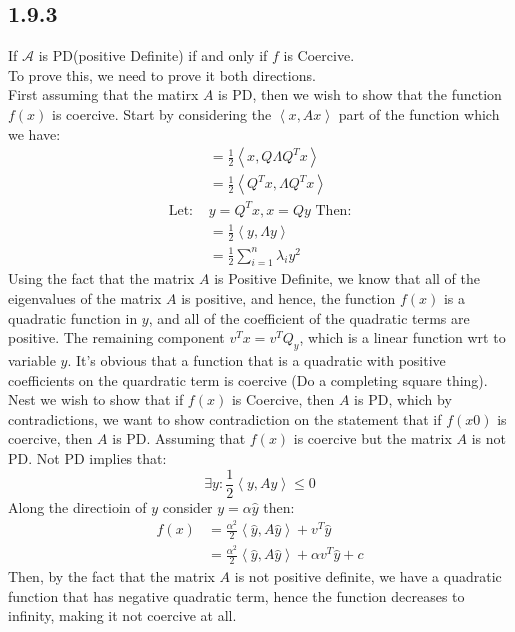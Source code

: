 \documentclass[]{article}
\begin{document}
    \subsection*{1.9.3}
        If $\mathcal{A}$ is PD(positive Definite) if and only if $f$ is Coercive. \\[1.1em]
        To prove this, we need to prove it both directions. 
        \\[1.1em]
        First assuming that the matirx $A$ is PD, then we wish to show that the function $f(x)$ is coercive. Start by considering the $\left\langle x, Ax \right\rangle$ part of the function which we have: 
        \begin{align*}\tag{1.9.3.1}\label{eqn:1.9.3.1}
            &=
            \frac{1}{2}\left\langle x, Q\Lambda Q^Tx \right\rangle
            \\
            & = \frac{1}{2}\left\langle Q^Tx, \Lambda Q^Tx \right\rangle
            \\
            \text{Let: }& y = Q^Tx, x = Qy \text{ Then:}
            \\
            &= \frac{1}{2}\left\langle y, \Lambda y \right\rangle
            \\
            &= 
            \frac{1}{2}\sum_{i = 1}^{n} \lambda_i y^2
        \end{align*}
        Using the fact that the matrix $A$ is Positive Definite, we know that all of the eigenvalues of the matrix $A$ is positive, and hence, the function $f(x)$ is a quadratic function in $y$, and all of the coefficient of the quadratic terms are positive. The remaining component $v^Tx = v^TQ_y$, which is a linear function wrt to variable $y$. It's obvious that a function that is a quadratic with positive coefficients on the quardratic term is coercive (Do a completing square thing). 
        \\[1.1em]
        Nest we wish to show that if $f(x)$ is Coercive, then $A$ is PD, which by contradictions, we want to show contradiction on the statement that if $f(x0)$ is coercive, then $A$ is PD. Assuming  that $f(x)$ is coercive but the matrix $A$ is not PD. Not PD implies that: 
        $$
            \exists y: \frac{1}{2}\left\langle y, Ay \right\rangle \le 0
        $$
        Along the directioin of $y$ consider $y = \alpha\hat{y}$ then: 
        \begin{align*}\tag{1.9.3.2}\label{eqn:1.9.3.2}
            f(x) &= \frac{\alpha^2}{2}\left\langle \hat{y}, A\hat{y} \right\rangle + v^T \hat{y}
            \\
            &= \frac{\alpha^2}{2}\left\langle \hat{y}, A\hat{y} \right\rangle + \alpha v^T \hat{y} + c
        \end{align*}
        Then, by the fact that the matrix $A$ is not positive definite, we have a quadratic function that has negative quadratic term, hence the function decreases to infinity, making it not coercive at all. 
\end{document}

